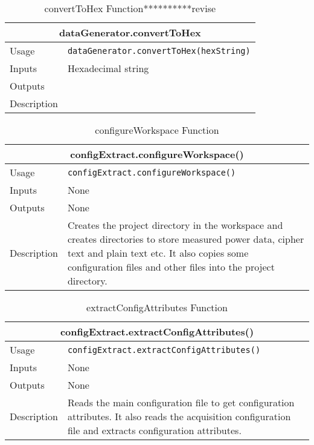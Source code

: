 \begin{table}[H]
\caption{convertToHex Function**********revise}
\begin{tabular}{ |p{2cm}||p{11cm}|  }
 \hline
 \multicolumn{2}{|c|}{\cellcolor{teal}\textbf{dataGenerator.convertToHex}} \\
 \hline
 Usage & \texttt{dataGenerator.convertToHex(hexString)}\\ \hline
 Inputs & Hexadecimal string  \\ \hline
 Outputs &  \\ \hline
 Description &  \\ \hline
\end{tabular}
\end{table}
\begin{table}[H]
\caption{configureWorkspace Function}
\begin{tabular}{ |p{2cm}||p{11cm}|  }
 \hline
 \multicolumn{2}{|c|}{\cellcolor{teal}\textbf{configExtract.configureWorkspace()}} \\
 \hline
 Usage & \texttt{configExtract.configureWorkspace()}\\ \hline
 Inputs & None \\ \hline
 Outputs &  None \\ \hline
 Description & Creates the project directory in the workspace and creates directories to store measured power data, cipher text and plain text etc.
 It also copies some configuration files and other files into the project directory. \\ \hline
\end{tabular}
\end{table}

\begin{table}[H]
\caption{extractConfigAttributes Function}
\begin{tabular}{ |p{2cm}||p{11cm}|  }
 \hline
 \multicolumn{2}{|c|}{\cellcolor{teal}\textbf{configExtract.extractConfigAttributes()}} \\
 \hline
 Usage & \texttt{configExtract.extractConfigAttributes()}\\ \hline
 Inputs & None \\ \hline
 Outputs &  None \\ \hline
 Description & Reads the main configuration file to get configuration attributes. It also reads the acquisition configuration file and extracts configuration attributes. \\ \hline
\end{tabular}
\end{table}

